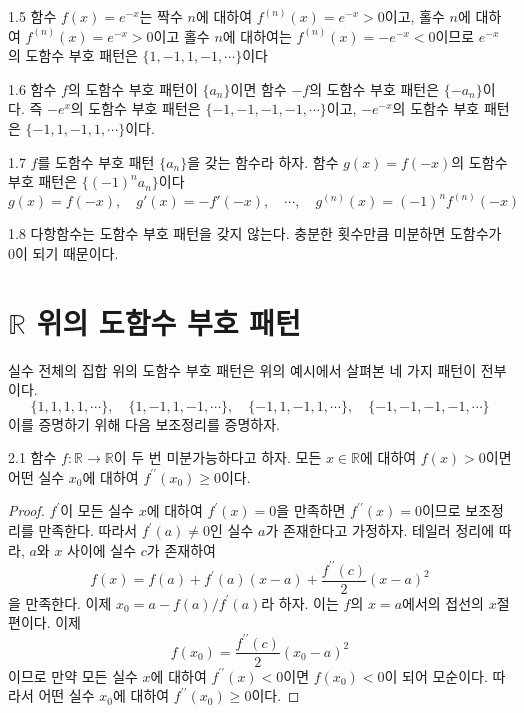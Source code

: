 \documentclass{article}
\begin{document}
\begin{example}{}{1.5}
    함수 $f(x)=e^{-x}$는 짝수 $n$에 대하여 $f^{(n)}(x)=e^{-x}>0$이고, 홀수 $n$에 대하여 $f^{(n)}(x)=e^{-x}>0$이고 홀수 $n$에 대하여는 $f^{(n)}(x)=-e^{-x}<0$이므로 $e^{-x}$의 도함수 부호 패턴은 $\{1,-1,1,-1,\cdots\}$이다
\end{example}

\begin{example}{}{1.6}
    함수 $f$의 도함수 부호 패턴이 $\{a_n\}$이면 함수 $-f$의 도함수 부호 패턴은 $\{-a_n\}$이다. 즉 $-e^x$의 도함수 부호 패턴은 $\{-1,-1,-1,-1,\cdots\}$이고, $-e^{-x}$의 도함수 부호 패턴은 $\{-1,1,-1,1,\cdots\}$이다.
\end{example}

\begin{example}{}{1.7}
    $f$를 도함수 부호 패턴 $\{a_n\}$을 갖는 함수라 하자. 함수 $g(x)=f(-x)$의 도함수 부호 패턴은 $\{(-1)^na_n\}$이다
    \[
        g(x)=f(-x),\quad g'(x)=-f'(-x),\quad\cdots,\quad g^{(n)}(x)=(-1)^nf^{(n)}(-x)
    \]
\end{example}

\begin{example}{}{1.8}
    다항함수는 도함수 부호 패턴을 갖지 않는다. 충분한 횟수만큼 미분하면 도함수가 0이 되기 때문이다.
\end{example}

\section{$\mathbb R$ 위의 도함수 부호 패턴}
실수 전체의 집합 위의 도함수 부호 패턴은 위의 예시에서 살펴본 네 가지 패턴이 전부이다.
\[
    \{1,1,1,1,\cdots\},\quad \{1,-1,1,-1,\cdots\},\quad \{-1,1,-1,1,\cdots\},\quad \{-1,-1,-1,-1,\cdots\}
\]
이를 증명하기 위해 다음 보조정리를 증명하자.

\begin{lemma}{}{2.1}
    함수 $f:\mathbb R\to\mathbb R$이 두 번 미분가능하다고 하자. 모든 $x\in\mathbb R$에 대하여 $f(x)>0$이면 어떤 실수 $x_0$에 대하여 $f^{\prime\prime}(x_0)\geq0$이다.
\end{lemma}

\begin{proof}
    $f^\prime$이 모든 실수 $x$에 대하여 $f^\prime(x)=0$을 만족하면 $f^{\prime\prime}(x)=0$이므로 보조정리를 만족한다. 따라서 $f^\prime(a)\ne0$인 실수 $a$가 존재한다고 가정하자. 테일러 정리에 따라, $a$와 $x$ 사이에 실수 $c$가 존재하여
    \[
        f(x)=f(a)+f^\prime(a)(x-a)+\frac{f^{\prime\prime}(c)}{2}(x-a)^2
    \]
    을 만족한다. 이제 $x_0=a-f(a)/f^\prime(a)$라 하자. 이는 $f$의 $x=a$에서의 접선의 $x$절편이다. 이제
    \[
        f(x_0)=\frac{f^{\prime\prime}(c)}{2}(x_0-a)^2
    \]
    이므로 만약 모든 실수 $x$에 대하여 $f^{\prime\prime}(x)<0$이면 $f(x_0)<0$이 되어 모순이다. 따라서 어떤 실수 $x_0$에 대하여 $f^{\prime\prime}(x_0)\geq0$이다.
\end{proof}
\end{document}
